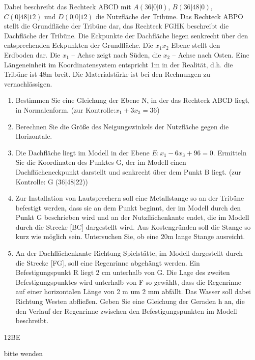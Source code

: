 \documentclass[a4paper,12pt]{article}
\begin{document}
Dabei beschreibt das Rechteck ABCD mit
  $A (36|0|0)$, $ B (36|48|0)$, $C (0|48|12)$ und $ D (0|0|12) $
die Nutzfläche der Tribüne. Das Rechteck ABPO stellt die Grundfläche der Tribüne dar, das
Rechteck FGHK beschreibt die Dachfläche der Tribüne. Die Eckpunkte der Dachfläche liegen
senkrecht über den entsprechenden Eckpunkten der Grundfläche.
Die $x_1x_2 $  Ebene stellt den Erdboden dar. Die $ x_1$ – Achse zeigt nach Süden, die $x_2$ – Achse nach
Osten. Eine Längeneinheit im Koordinatensystem entspricht 1m in der Realität, d.h. die Tribüne ist
48m breit. Die Materialstärke ist bei den Rechnungen zu vernachlässigen.
\begin{enumerate}[label={\alph*)}]
\item  Bestimmen Sie eine Gleichung der Ebene N, in der das Rechteck ABCD liegt, in
Normalenform. (zur Kontrolle:$ x_1 + 3x_3 = 36 $)
\item Berechnen Sie die Größe des Neigungswinkels der Nutzfläche gegen die Horizontale.
\item Die Dachfläche liegt im Modell in der Ebene $E: x_1 - 6x_3 + 96 = 0.$
Ermitteln Sie die Koordinaten des Punktes G, der im Modell einen Dachflächeneckpunkt
darstellt und senkrecht über dem Punkt B liegt. (zur Kontrolle: G (36|48|22))
\item Zur Installation von Lautsprechern soll eine Metallstange so an der Tribüne befestigt
werden, dass sie an dem Punkt beginnt, der im Modell durch den Punkt G beschrieben wird
und an der Nutzflächenkante endet, die im Modell durch die Strecke [BC] dargestellt wird.
Aus Kostengründen soll die Stange so kurz wie möglich sein. Untersuchen Sie, ob eine 20m
lange Stange ausreicht.
\item An der Dachflächenkante Richtung Spielstätte, im Modell dargestellt durch die Strecke
[FG], soll eine Regenrinne abgehängt werden. Ein Befestigungspunkt R liegt 2 cm
unterhalb von G. Die Lage des zweiten Befestigungspunktes wird unterhalb von F so
gewählt, dass die Regenrinne auf einer horizontalen Länge von 2 m um 2 mm abfällt. Das
Wasser soll dabei Richtung Westen abfließen. Geben Sie eine Gleichung der Geraden h an,
die den Verlauf der Regenrinne zwischen den Befestigungspunkten im Modell beschreibt.
\end{enumerate}


\begin{flushright}12BE \end{flushright}
\begin{flushright}bitte wenden \end{flushright}
\end{document}
